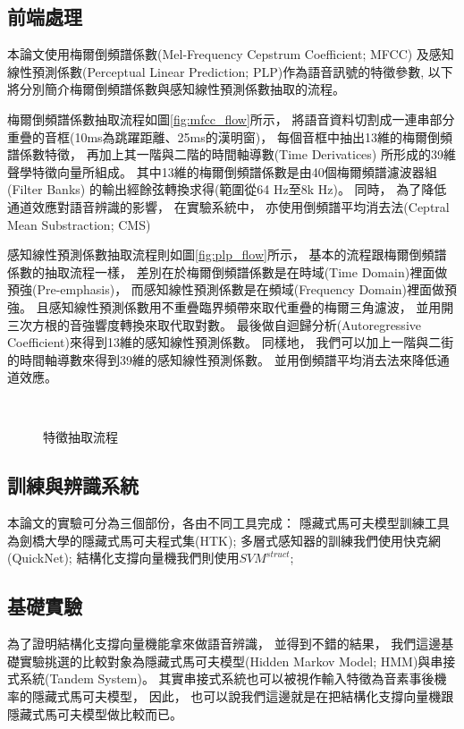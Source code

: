   \subsection{前端處理}
  \label{subsec:feature_extraction}
  本論文使用梅爾倒頻譜係數(Mel-Frequency Cepstrum Coefficient; MFCC) \cite{Huang} 
  及感知線性預測係數(Perceptual Linear Prediction; PLP)\cite{HermanskyPLP}作為語音訊號的特徵參數,
  以下將分別簡介梅爾倒頻譜係數與感知線性預測係數抽取的流程。

  梅爾倒頻譜係數抽取流程如圖\ref{fig:mfcc_flow}所示，
  將語音資料切割成一連串部分重疊的音框(10ms為跳躍距離、25ms的漢明窗)，
  每個音框中抽出13維的梅爾倒頻譜係數特徵，
  再加上其一階與二階的時間軸導數(Time Derivatices)
  所形成的39維聲學特徵向量所組成。
  其中13維的梅爾倒頻譜係數是由40個梅爾頻譜濾波器組(Filter Banks)
  的輸出經餘弦轉換求得(範圍從64 Hz至8k Hz)。
  同時，
  為了降低通道效應對語音辨識的影響，
  在實驗系統中，
  亦使用倒頻譜平均消去法(Ceptral Mean Substraction; CMS)\cite{FuruiCMS}

  感知線性預測係數抽取流程則如圖\ref{fig:plp_flow}所示，
  基本的流程跟梅爾倒頻譜係數的抽取流程一樣，
  差別在於梅爾倒頻譜係數是在時域(Time Domain)裡面做預強(Pre-emphasis)，
  而感知線性預測係數是在頻域(Frequency Domain)裡面做預強。
  且感知線性預測係數用不重疊臨界頻帶來取代重疊的梅爾三角濾波，
  並用開三次方根的音強響度轉換來取代取對數。
  最後做自迴歸分析(Autoregressive Coefficient)來得到13維的感知線性預測係數。
  同樣地，
  我們可以加上一階與二街的時間軸導數來得到39維的感知線性預測係數。
  並用倒頻譜平均消去法來降低通道效應。
  \begin{figure}
     \\
    \label{fig:feature_extraction_flow}
    \caption{特徵抽取流程}
  \end{figure}

  \subsection{訓練與辨識系統}
  本論文的實驗可分為三個部份，各由不同工具完成：
  隱藏式馬可夫模型訓練工具為劍橋大學的隱藏式馬可夫程式集(HTK)\cite{HTK};
  多層式感知器的訓練我們使用快克網(QuickNet)\cite{QuickNet};
  結構化支撐向量機我們則使用$SVM^{struct}$\cite{SVMHMM};

  \subsection{基礎實驗}
  為了證明結構化支撐向量機能拿來做語音辨識，
  並得到不錯的結果，
  我們這邊基礎實驗挑選的比較對象為隱藏式馬可夫模型(Hidden Markov Model; HMM)與串接式系統(Tandem System)。
  其實串接式系統也可以被視作輸入特徵為音素事後機率的隱藏式馬可夫模型，
  因此，
  也可以說我們這邊就是在把結構化支撐向量機跟隱藏式馬可夫模型做比較而已。

